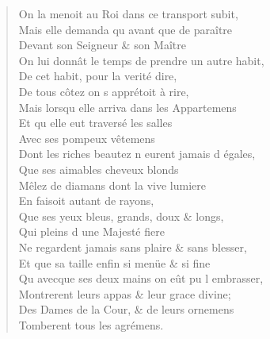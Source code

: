 \documentclass[14pt,a4paper]{memoir}
\begin{document}
{{\begin{otherlanguage}{french}
\begin{verse}
On la menoit au Roi dans ce transport subit, \\
Mais elle demanda qu\textquotesingle{} avant que de paraître \\
\vin Devant son Seigneur \& son Maître \\
On lui donnât le temps de prendre un autre habit, \\
\vin De cet habit, pour la verité dire, \\
\vin De tous côtez on s\textquotesingle{} apprétoit à rire, \\
Mais lorsqu\textquotesingle{} elle arriva dans les Appartemens \\
\vin Et qu\textquotesingle{} elle eut traversé les salles \\
\vin Avec ses pompeux vêtemens \\
Dont les riches beautez n\textquotesingle{} eurent jamais d\textquotesingle{} égales, \\
\vin Que ses aimables cheveux blonds \\
Mêlez de diamans dont la vive lumiere \\
\vin En faisoit autant de rayons, \\
\vin Que ses yeux bleus, grands, doux \& longs, \\
\vin Qui pleins d\textquotesingle{} une Majesté fiere \\
Ne regardent jamais sans plaire \& sans blesser, \\
Et que sa taille enfin si menüe \& si fine \\
Qu\textquotesingle{} avecque ses deux mains on eût pu l\textquotesingle{} embrasser, \\
Montrerent leurs appas \& leur grace divine; \\
Des Dames de la Cour, \& de leurs ornemens \\
\vin Tomberent tous les agrémens.


\end{verse}
\end{otherlanguage}}}
\end{document}
